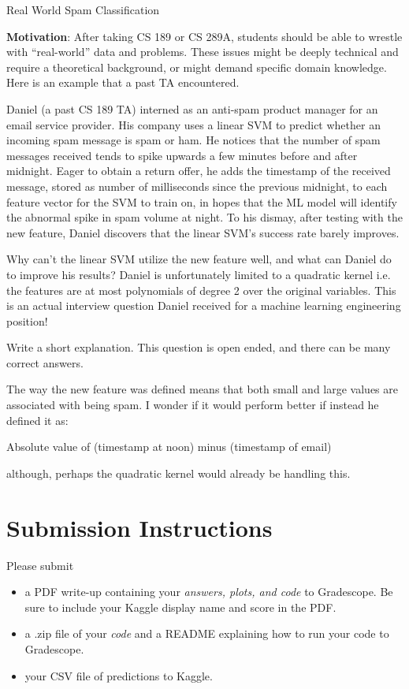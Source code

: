 \documentclass[section]{problemset}
\begin{document}
\newpage


\begin{problem}{Real World Spam Classification}


\textbf{Motivation}: After taking CS 189 or CS 289A, students should be able to wrestle with ``real-world'' data and problems. These issues might be deeply technical and require a theoretical background, or might demand specific domain knowledge. Here is an example that a past TA encountered.

Daniel (a past CS 189 TA) interned as an anti-spam product manager for an email service provider. His company uses a linear SVM to predict whether an incoming spam message is spam or ham. He notices that the number of spam messages received tends to spike upwards a few minutes before and after midnight. Eager to obtain a return offer, he adds the timestamp of the received message, stored as number of milliseconds since the previous midnight, to each feature vector for the SVM to train on, in hopes that the ML model will identify the abnormal spike in spam volume at night. To his dismay, after testing with the new feature, Daniel discovers that the linear SVM's success rate barely improves.

Why can't the linear SVM utilize the new feature well, and what can Daniel do to improve his results? Daniel is unfortunately limited to a quadratic kernel i.e. the features are at most polynomials of degree 2 over the original variables. This is an actual interview question Daniel received for a machine learning engineering position!

Write a short explanation. This question is open ended, and there can be many correct answers.

\end{problem}

\begin{mdframed}
  The way the new feature was defined means that both small and large values
  are associated with being spam. I wonder if it would perform better if
  instead he defined it as:
  \begin{center}
    Absolute value of (timestamp at noon) minus (timestamp of email)
  \end{center}
  although, perhaps the quadratic kernel would already be handling this.

\end{mdframed}

\newpage


\section*{Submission Instructions}
Please submit
\begin{itemize}
\item a PDF write-up containing your \textit{answers, plots, and code} to Gradescope. Be sure to include your Kaggle display name and score in the PDF.
\item a .zip file of your \textit{code} and a README explaining how to run your code to Gradescope.
\item your CSV file of predictions to Kaggle.
\end{itemize}
\end{document}

